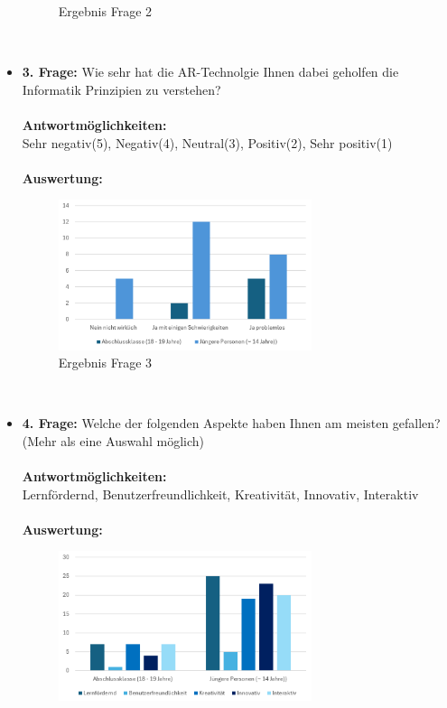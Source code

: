 \begin{itemize}
\begin{figure}[H]
        \caption{Ergebnis Frage 2}
        \label{fig:fr1}
    \end{figure}
    \\
    \item \textbf{3. Frage:} Wie sehr hat die AR-Technolgie Ihnen dabei geholfen die Informatik Prinzipien zu verstehen?
    \\
    \\
    \textbf{Antwortmöglichkeiten:}\\
    Sehr negativ(5), Negativ(4), Neutral(3), Positiv(2), Sehr positiv(1)
    \\
    \\
    \textbf{Auswertung:}
    \begin{figure}[H]
        \centering
        \includegraphics[width=0.7\textwidth]{images/AuswertungFrage2}
        \caption{Ergebnis Frage 3}
        \label{fig:fr1}
    \end{figure}
    \\
    \item \textbf{4. Frage:} Welche der folgenden Aspekte haben Ihnen am meisten gefallen? (Mehr als eine Auswahl möglich)
    \\
    \\
    \textbf{Antwortmöglichkeiten:}\\
    Lernfördernd, Benutzerfreundlichkeit, Kreativität, Innovativ, Interaktiv
    \\
    \\
    \textbf{Auswertung:}
    \begin{figure}[H]
        \centering
        \includegraphics[width=0.7\textwidth]{images/AuswertungFrage4}

\end{figure}
\end{itemize}
